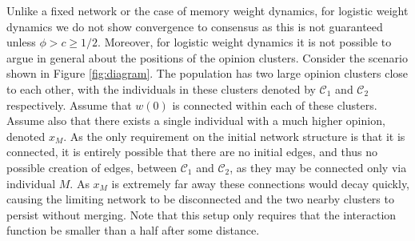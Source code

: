 \documentclass{article}
\begin{document}
\begin{remark} \label{Remark: Not possible to identify cluster locations}
    Unlike a fixed network or the case of memory weight dynamics, for logistic weight dynamics we do not show convergence to consensus as this is not guaranteed unless $\phi>c\geq 1/2$. Moreover, for logistic weight dynamics it is not possible to argue in general about the positions of the opinion clusters. Consider the scenario shown in Figure \ref{fig:diagram}. The population has two large opinion clusters close to each other, with the individuals in these clusters denoted by $\mathcal{C}_1$ and $\mathcal{C}_2$ respectively. Assume that $w(0)$ is connected within each of these clusters. Assume also that there exists a single individual with a much higher opinion, denoted $x_M$. As the only requirement on the initial network structure is that it is connected, it is entirely possible that there are no initial edges, and thus no possible creation of edges, between $\mathcal{C}_1$ and $\mathcal{C}_2$, as they may be connected only via individual $M$. As $x_M$ is extremely far away these connections would decay quickly, causing the limiting network to be disconnected and the two nearby clusters to persist without merging. Note that this setup only requires that the interaction function be smaller than a half after some distance. 
\begin{figure}[!ht]
\centering
{}
\end{figure}
\end{remark}
\end{document}
